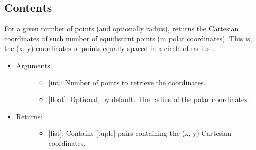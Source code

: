 \documentclass[letterpaper,10pt,english]{sphinxmanual}
\begin{document}
\subsection{Contents}
\label{\detokenize{spatial:contents}}

\begin{fulllineitems}
\label{\detokenize{spatial:data_tools.spatial.equidist_polar}}
For a given number of points (and optionally radius), returns the
Cartesian coordinates of such number of equidistant points (in polar
coordinates). This is, the (x, y) coordinates of  points equally
spaced in a circle of radius .
\begin{itemize}
\item {} \begin{description}
\item[{Arguments:}] \leavevmode\begin{itemize}
\item {} 
 {[}int{]}: Number of points to retrieve the coordinates.

\item {} 
 {[}float{]}: Optional,  by default. The radius of the
polar coordinates.

\end{itemize}

\end{description}

\item {} \begin{description}
\item[{Returns:}] \leavevmode\begin{itemize}
\item {} 
{[}list{]}: Contains  {[}tuple{]} pairs containing the (x, y)
Cartesian coordinates.

\end{itemize}

\end{description}

\end{itemize}

\end{fulllineitems}

\end{document}
